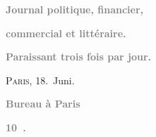 \pstart
           \begin{otherlanguage}{french}\textcolor{gray}{\textbf{Journal politique, financier,}}\end{otherlanguage}\pend
           
\pstart
           \begin{otherlanguage}{french}\textcolor{gray}{\textbf{commercial et littéraire.}}\end{otherlanguage}\pend
           
\pstart
           \begin{otherlanguage}{french}\textcolor{gray}{\textbf{\textbf{Paraissant trois fois par jour.}}}\end{otherlanguage}\hfill \textsc{Paris}, 18. Juni.\pend
           
\pstart
           \begin{otherlanguage}{french}\textcolor{gray}{\textbf{\textbf{Bureau à Paris}}}\end{otherlanguage}\pend
           
\pstart
           \begin{otherlanguage}{french}\textcolor{gray}{\textbf{\textbf{10 .}}}\end{otherlanguage}\pend
           
